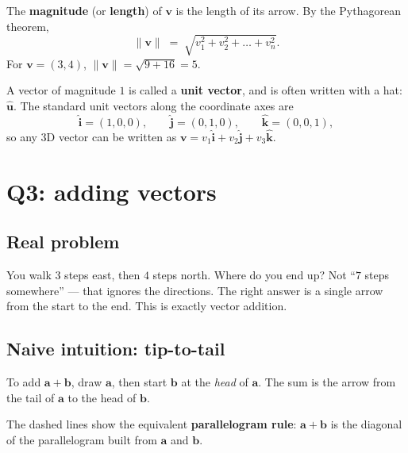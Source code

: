 \documentclass[11pt,a4paper]{article}
\newcommand{\vect}[1]{\boldsymbol{#1}}
\newcommand{\vhat}[1]{\hat{\boldsymbol{#1}}}
\begin{document}
The \textbf{magnitude} (or \textbf{length}) of $\vect{v}$ is the length of its arrow.
By the Pythagorean theorem,
\[
  \lVert \vect{v} \rVert \;=\; \sqrt{v_1^2 + v_2^2 + \dots + v_n^2}.
\]
For $\vect{v} = (3, 4)$, $\lVert \vect{v} \rVert = \sqrt{9+16} = 5$.

A vector of magnitude $1$ is called a \textbf{unit vector}, and is often written
with a hat: $\vhat{u}$. The standard unit vectors along the coordinate axes are
\[
  \vhat{i} = (1,0,0), \qquad
  \vhat{j} = (0,1,0), \qquad
  \vhat{k} = (0,0,1),
\]
so any 3D vector can be written as
$\vect{v} = v_1\vhat{i} + v_2\vhat{j} + v_3\vhat{k}$.

\section{Q3: adding vectors}

\subsection*{Real problem}

You walk $3$ steps east, then $4$ steps north. Where do you end up?
Not ``$7$ steps somewhere'' --- that ignores the directions.
The right answer is a single arrow from the start to the end.
This is exactly vector addition.

\subsection*{Naive intuition: tip-to-tail}

To add $\vect{a} + \vect{b}$, draw $\vect{a}$, then start $\vect{b}$ at the
\emph{head} of $\vect{a}$. The sum is the arrow from the tail of $\vect{a}$ to
the head of $\vect{b}$.

\begin{center}
\end{center}

The dashed lines show the equivalent \textbf{parallelogram rule}:
$\vect{a}+\vect{b}$ is the diagonal of the parallelogram built from $\vect{a}$ and $\vect{b}$.
\end{document}
